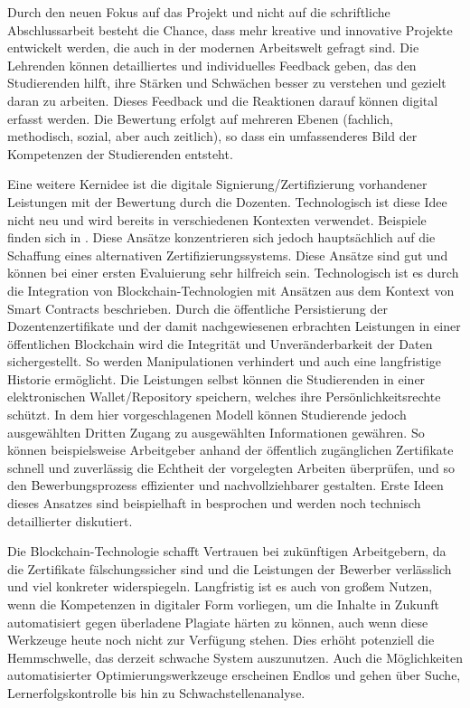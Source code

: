 \documentclass[conference]{IEEEtran}
\begin{document}
Durch den neuen Fokus auf das Projekt und nicht auf die schriftliche Abschlussarbeit besteht die Chance, dass mehr kreative und innovative Projekte entwickelt werden, die auch in der modernen Arbeitswelt gefragt sind. Die Lehrenden können detailliertes und individuelles Feedback geben, das den Studierenden hilft, ihre Stärken und Schwächen besser zu verstehen und gezielt daran zu arbeiten. Dieses Feedback und die Reaktionen darauf können digital erfasst werden. Die Bewertung erfolgt auf mehreren Ebenen (fachlich, methodisch, sozial, aber auch zeitlich), so dass ein umfassenderes Bild der Kompetenzen der Studierenden entsteht.

Eine weitere Kernidee ist die digitale Signierung/Zertifizierung vorhandener Leistungen mit der Bewertung durch die Dozenten.  Technologisch ist diese Idee nicht neu und wird bereits in verschiedenen Kontexten verwendet. Beispiele finden sich in \cite{alammary2019blockchain}. Diese Ansätze konzentrieren sich jedoch hauptsächlich auf die Schaffung eines alternativen Zertifizierungssystems. Diese Ansätze sind gut und können bei einer ersten Evaluierung sehr hilfreich sein. Technologisch ist  es durch die Integration von Blockchain-Technologien mit Ansätzen aus dem Kontext von Smart Contracts beschrieben. Durch die öffentliche Persistierung der Dozentenzertifikate und der damit nachgewiesenen erbrachten Leistungen in einer öffentlichen Blockchain wird die Integrität und Unveränderbarkeit der Daten sichergestellt. So werden Manipulationen verhindert und auch eine langfristige Historie ermöglicht. Die Leistungen selbst können die Studierenden in einer elektronischen Wallet/Repository speichern, welches ihre Persönlichkeitsrechte schützt. In dem hier vorgeschlagenen Modell können Studierende jedoch ausgewählten Dritten Zugang zu ausgewählten Informationen gewähren.  So können beispielsweise Arbeitgeber anhand der öffentlich zugänglichen Zertifikate schnell und zuverlässig die Echtheit der vorgelegten Arbeiten überprüfen, und so  den Bewerbungsprozess effizienter und nachvollziehbarer gestalten. Erste Ideen dieses Ansatzes sind beispielhaft in \cite{Idee} besprochen und werden noch technisch detaillierter diskutiert.

Die Blockchain-Technologie schafft Vertrauen bei zukünftigen Arbeitgebern, da die Zertifikate fälschungssicher sind und die Leistungen der Bewerber verlässlich und viel konkreter widerspiegeln. Langfristig ist es auch von großem Nutzen, wenn die Kompetenzen in digitaler Form vorliegen, um die Inhalte in Zukunft automatisiert gegen überladene Plagiate härten zu können, auch wenn diese Werkzeuge heute noch nicht zur Verfügung stehen. Dies erhöht potenziell die Hemmschwelle, das derzeit schwache System auszunutzen. Auch die Möglichkeiten automatisierter Optimierungswerkzeuge erscheinen Endlos und gehen über Suche, Lernerfolgskontrolle bis hin zu Schwachstellenanalyse. 
\end{document}
